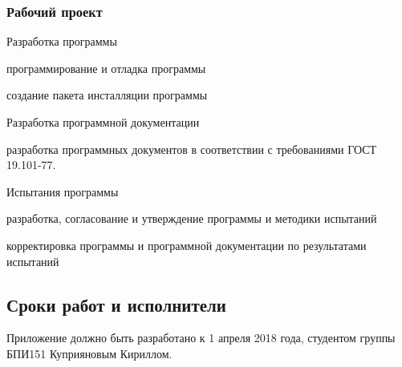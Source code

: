 \subsubsection{Рабочий проект}
\begin{my_enumerate}
    \item Разработка программы
        \begin{my_enumerate}
            \item программирование и отладка программы
            \item создание пакета инсталляции программы
        \end{my_enumerate}
    \item Разработка программной документации
        \begin{my_enumerate}
            \item разработка программных документов в соответствии с требованиями ГОСТ 19.101-77.
        \end{my_enumerate}
     \item Испытания программы
           \begin{my_enumerate}
             \item разработка, согласование и утверждение программы и методики испытаний
            \item корректировка программы и программной документации по результатами испытаний
         \end{my_enumerate}
\end{my_enumerate}

\subsection{Сроки работ и исполнители}

Приложение должно быть разработано к 1 апреля 2018 года, студентом группы БПИ151 
Куприяновым Кириллом.


